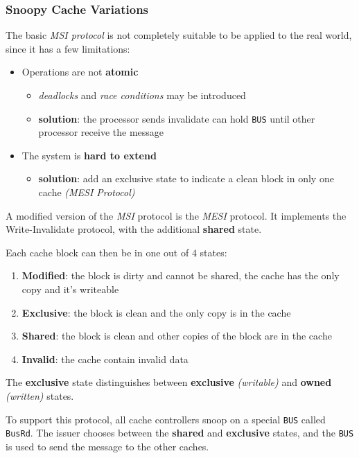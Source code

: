 \documentclass[english]{article}
\begin{document}
\subsubsection{Snoopy Cache Variations}

The basic \textit{MSI protocol} is not completely suitable to be applied to the real world, since it has a few limitations:

\begin{itemize}
  \item Operations are not \textbf{atomic}
        \begin{itemize}
          \item \textit{deadlocks} and \textit{race conditions} may be introduced
          \item \textbf{solution}: the processor sends invalidate can hold \texttt{BUS} until other processor receive the message
        \end{itemize}
  \item The system is \textbf{hard to extend}
        \begin{itemize}
          \item \textbf{solution}: add an exclusive state to indicate a clean block in only one cache \textit{(MESI Protocol)}
        \end{itemize}
\end{itemize}

\bigskip
A modified version of the \textit{MSI} protocol is the \textit{MESI} protocol.
It implements the Write-Invalidate protocol, with the additional \textbf{shared} state.

Each cache block can then be in one out of \(4\) states:

\begin{enumerate}
  \item \textbf{Modified}: the block is dirty and cannot be shared, the cache has the only copy and it's writeable
  \item \textbf{Exclusive}: the block is clean and the only copy is in the cache
  \item \textbf{Shared}: the block is clean and other copies of the block are in the cache
  \item \textbf{Invalid}: the cache contain invalid data
\end{enumerate}

The \textbf{exclusive} state distinguishes between \textbf{exclusive} \textit{(writable)} and \textbf{owned} \textit{(written)} states.

To support this protocol, all cache controllers snoop on a special \texttt{BUS} called \texttt{BusRd}.
The issuer chooses between the \textbf{shared} and \textbf{exclusive} states, and the \texttt{BUS} is used to send the message to the other caches.
\end{document}
